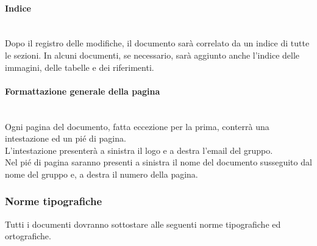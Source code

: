 	\paragraph{Indice}
	~\\Dopo il registro delle modifiche, il documento sarà correlato da un indice di tutte le sezioni. In alcuni documenti, se necessario, sarà aggiunto anche l'indice delle immagini, delle tabelle e dei riferimenti.
	\paragraph{Formattazione generale della pagina}
	~\\Ogni pagina del documento, fatta eccezione per la prima, conterrà una intestazione ed un pié di pagina.
	\\L'intestazione presenterà a sinistra il logo e a destra l'email del gruppo.
	\\Nel pié di pagina saranno presenti a sinistra il nome del documento susseguito dal nome del gruppo e, a destra il numero della pagina.
	\subsubsection{Norme tipografiche}
	Tutti i documenti dovranno sottostare alle seguenti norme tipografiche ed ortografiche.
